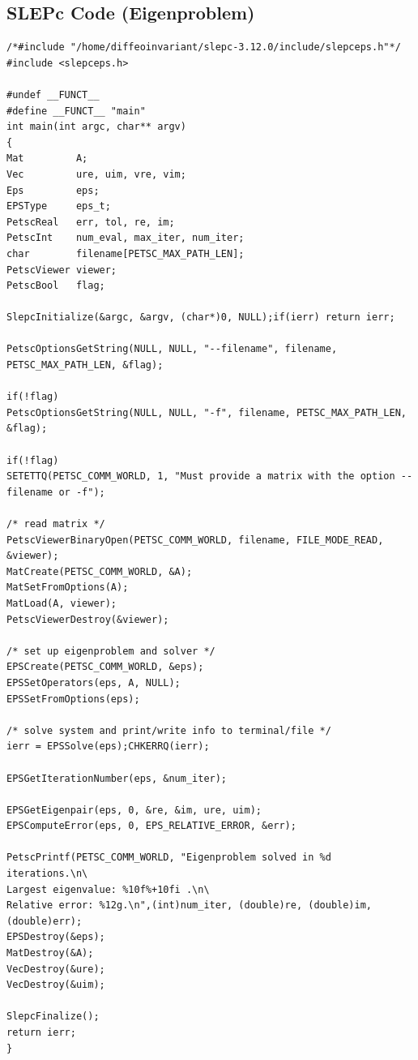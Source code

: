 \documentclass[11pt]{article}
\begin{document}
\subsection*{SLEPc Code (Eigenproblem)}
\begin{Verbatim}[xleftmargin=-2cm]
/*#include "/home/diffeoinvariant/slepc-3.12.0/include/slepceps.h"*/
#include <slepceps.h>

#undef __FUNCT__
#define __FUNCT__ "main"
int main(int argc, char** argv)
{
Mat         A;
Vec         ure, uim, vre, vim;
Eps         eps;
EPSType     eps_t;
PetscReal   err, tol, re, im;
PetscInt    num_eval, max_iter, num_iter;
char        filename[PETSC_MAX_PATH_LEN];
PetscViewer viewer;
PetscBool   flag;

SlepcInitialize(&argc, &argv, (char*)0, NULL);if(ierr) return ierr;

PetscOptionsGetString(NULL, NULL, "--filename", filename, PETSC_MAX_PATH_LEN, &flag);

if(!flag)
PetscOptionsGetString(NULL, NULL, "-f", filename, PETSC_MAX_PATH_LEN, &flag);

if(!flag)
SETETTQ(PETSC_COMM_WORLD, 1, "Must provide a matrix with the option --filename or -f");

/* read matrix */
PetscViewerBinaryOpen(PETSC_COMM_WORLD, filename, FILE_MODE_READ, &viewer);
MatCreate(PETSC_COMM_WORLD, &A);
MatSetFromOptions(A);
MatLoad(A, viewer);
PetscViewerDestroy(&viewer);

/* set up eigenproblem and solver */
EPSCreate(PETSC_COMM_WORLD, &eps);
EPSSetOperators(eps, A, NULL);
EPSSetFromOptions(eps);

/* solve system and print/write info to terminal/file */
ierr = EPSSolve(eps);CHKERRQ(ierr);

EPSGetIterationNumber(eps, &num_iter);

EPSGetEigenpair(eps, 0, &re, &im, ure, uim);
EPSComputeError(eps, 0, EPS_RELATIVE_ERROR, &err);

PetscPrintf(PETSC_COMM_WORLD, "Eigenproblem solved in %d iterations.\n\
Largest eigenvalue: %10f%+10fi .\n\
Relative error: %12g.\n",(int)num_iter, (double)re, (double)im, (double)err);
EPSDestroy(&eps);
MatDestroy(&A);
VecDestroy(&ure);
VecDestroy(&uim);

SlepcFinalize();
return ierr;
}
\end{Verbatim}
\end{document}
